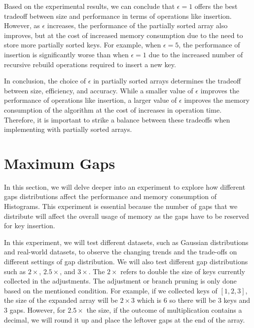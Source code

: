 Based on the experimental results, we can conclude that $\epsilon = 1$ offers the best tradeoff between size and performance in terms of operations like insertion. However, as $\epsilon$ increases, the performance of the partially sorted array also improves, but at the cost of increased memory consumption due to the need to store more partially sorted keys. For example, when $\epsilon = 5$, the performance of insertion is significantly worse than when $\epsilon = 1$ due to the increased number of recursive rebuild operations required to insert a new key.

In conclusion, the choice of $\epsilon$ in partially sorted arrays determines the tradeoff between size, efficiency, and accuracy. While a smaller value of $\epsilon$ improves the performance of operations like insertion, a larger value of $\epsilon$ improves the memory consumption of the algorithm at the cost of increases in operation time. Therefore, it is important to strike a balance between these tradeoffs when implementing \learnindex with partially sorted arrays.



\section{Maximum Gaps}
In this section, we will delve deeper into an experiment to explore how different gaps distributions affect the performance and memory consumption of Histograms. This experiment is essential because the number of gaps that we distribute will affect the overall usage of memory as the gaps have to be reserved for key insertion.

In this experiment, we will test different datasets, such as Gaussian distributions and real-world datasets, to observe the changing trends and the trade-offs on different settings of gap distribution. We will also test different gap distributions such as $2\times$, $2.5\times$, and $3\times$. The $2\times$ refers to double the size of keys currently collected in the adjustments. The adjustment or branch pruning is only done based on the mentioned condition. For example, if we collected keys of $[1,2,3]$, the size of the expanded array will be $2\times 3$ which is $6$ so there will be $3$ keys and $3$ gaps. However, for $2.5\times$ the size, if the outcome of multiplication contains a decimal, we will round it up and place the leftover gaps at the end of the array.

